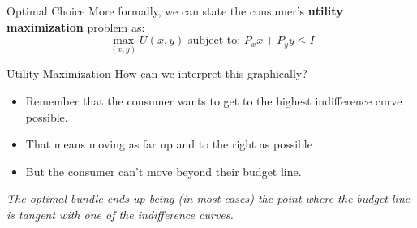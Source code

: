 \documentclass[12pt,t]{beamer}
\begin{document}
\begin{frame}{Optimal Choice}
  More formally, we can state the consumer's \textbf{utility maximization} problem as:
  $$
    \max_{(x,y)} U(x,y) \text{ subject to: } P_x x + P_y y \leq I
  $$
\end{frame}

\begin{frame}{Utility Maximization}
  How can we interpret this graphically?
  \begin{itemize}
    \item Remember that the consumer wants to get to the highest indifference curve possible.

    \item That means moving as far up and to the right as possible

    \item But the consumer can't move beyond their budget line.
  \end{itemize}
  
  \pause\bigskip
  \emph{The optimal bundle ends up being (in most cases) the point where the budget line is tangent with one of the indifference curves.}
\end{frame}
\end{document}
